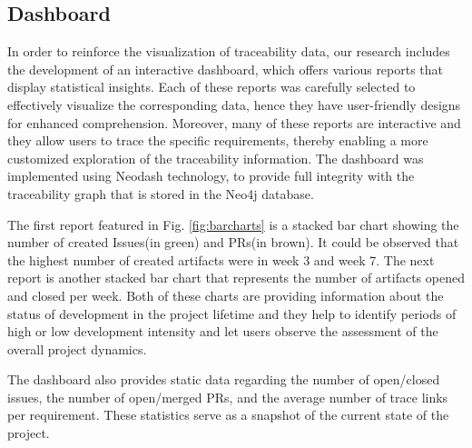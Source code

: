 



\subsection{Dashboard}
\label{sec:dboard}


In order to reinforce the visualization of traceability data, our research includes the development of an interactive dashboard, which offers various reports that display statistical insights. Each of these reports was carefully selected to effectively visualize the corresponding data, hence they have user-friendly designs for enhanced comprehension. Moreover, many of these reports are interactive and they allow users to trace the specific requirements, thereby enabling a more customized exploration of the traceability information.
The dashboard was implemented using Neodash technology, to provide full integrity with the traceability graph that is stored in the Neo4j database.

The first report featured in Fig. \ref{fig:barcharts} is a stacked bar chart showing the number of created Issues(in green) and PRs(in brown). It could be observed that the highest number of created artifacts were in week 3 and week 7. The next report is another stacked bar chart that represents the number of artifacts opened and closed per week. Both of these charts are providing information about the status of development in the project lifetime and they help to identify periods of high or low development intensity and let users observe the assessment of the overall project dynamics.

The dashboard also provides static data regarding the number of open/closed issues, the number of open/merged PRs, and the average number of trace links per requirement. These statistics serve as a snapshot of the current state of the project.

